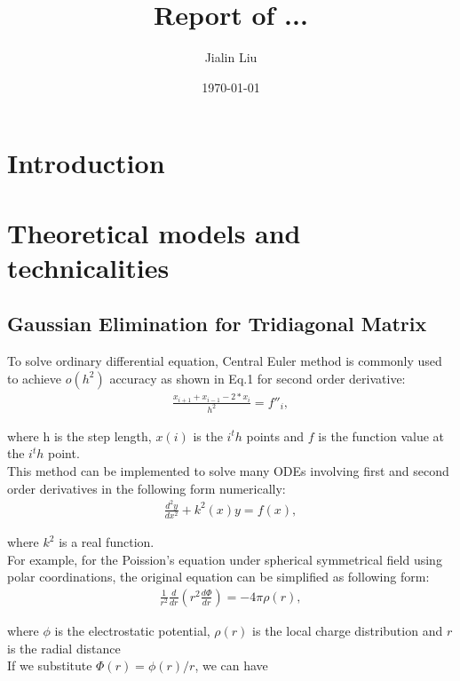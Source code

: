 \documentclass{article}
\begin{document}
\lstset{language=Pascal}          %
\title{Report of ...}
\author{Jialin Liu}
\date{\today}
\maketitle

\newpage

\section{Introduction}
\section{Theoretical models and technicalities}
\subsection{Gaussian Elimination for Tridiagonal Matrix}	
To solve ordinary differential equation, Central Euler method is commonly used to achieve $o(h^2)$ accuracy as shown in Eq.1 for second order derivative:\\

\begin{align}
\frac{x_{i+1}+x_{i-1}-2*x_i}{h^2} = f{''}_i,
\end{align}

where h is the step length, $x(i)$ is the $i^th$ points and $f$ is the function value at the $i^th$ point. \\
This method can be implemented to solve many ODEs involving first and second order derivatives in the following form numerically:\\

\begin{align}
\frac{d^2y}{dx^2}+k^2(x)y = f(x),
\end{align}

where $k^2$ is a real function.\\
For example, for the Poission's equation under spherical symmetrical field using polar coordinations, the original equation can be simplified as following form:\\

\begin{align}
\frac{1}{r^2}\frac{d}{dr}\left(r^2\frac{d\Phi}{dr}\right) = -4\pi \rho(r),
\end{align}

where $\phi$ is the electrostatic potential, $\rho(r)$ is the local charge distribution and $r$ is the radial distance\\
If we substitute $\Phi(r)= \phi(r)/r$, we can have \\
\end{document}
